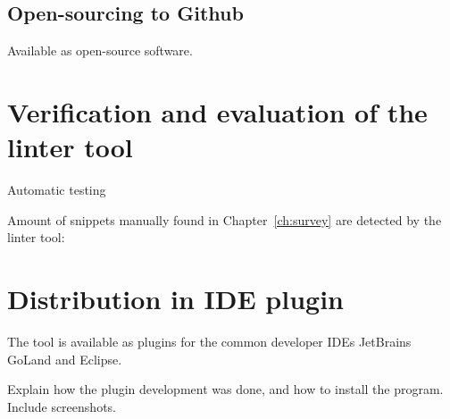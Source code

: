 \subsection{Open-sourcing to Github}\label{subsec:go-safer-github}

Available as open-source software.



\section{Verification and evaluation of the linter tool}\label{sec:go-safer-evaluation}

Automatic testing

Amount of snippets manually found in Chapter~\ref{ch:survey} are detected by the linter tool:



\section{Distribution in IDE plugin}\label{sec:go-safer-ide-plugin}

The tool is available as plugins for the common developer IDEs JetBrains GoLand and Eclipse.

Explain how the plugin development was done, and how to install the program. Include
screenshots.